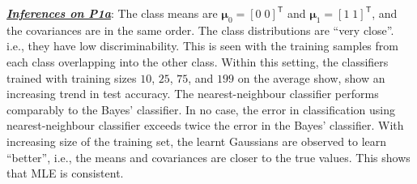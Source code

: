 \documentclass[12pt, a4 paper]{article}
\newcommand{\TT}{\mathsf{T}}
\newcommand{\bmu}{\boldsymbol{\mu}}
\begin{document}
\underline {\it \bfseries Inferences on P1a}: The class means are $\bmu_{0} = [0 \; 0]^{\TT}$ and $\bmu_{1} = [1 \; 1]^{\TT}$, and the covariances are in the same order. The class distributions are ``very close''. i.e., they have low discriminability. This is seen with the training samples from each class overlapping into the other class. Within this setting, the classifiers trained with training sizes $10$, $25$, $75$, and $199$ on the average show, show an increasing trend in test accuracy. The nearest-neighbour classifier performs comparably to the Bayes' classifier. In no case, the error in classification using nearest-neighbour classifier exceeds twice the error in the Bayes' classifier. With increasing size of the training set, the learnt Gaussians are observed to learn ``better'', i.e., the means and covariances are closer to the true values. This shows that MLE is consistent. \\
\end{document}
